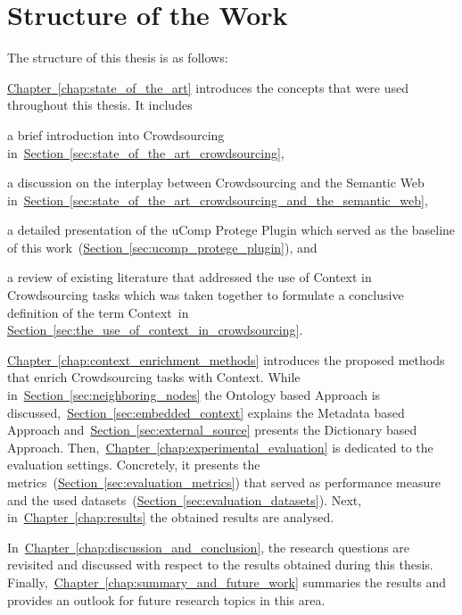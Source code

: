 \section{Structure of the Work}
The structure of this thesis is as follows:

\hyperref[chap:state_of_the_art]{Chapter~\ref*{chap:state_of_the_art}} introduces the concepts that were used throughout this thesis. It includes
\begin{inparaenum}[i)]
		\item a brief introduction into Crowdsourcing in~\hyperref[sec:state_of_the_art_crowdsourcing]{Section~\ref*{sec:state_of_the_art_crowdsourcing}},
		\item a discussion on the interplay between Crowdsourcing and the Semantic Web in~\hyperref[sec:state_of_the_art_crowdsourcing_and_the_semantic_web]{Section~\ref*{sec:state_of_the_art_crowdsourcing_and_the_semantic_web}},
		\item a detailed presentation of the uComp Protege Plugin which served as the baseline of this work~(\hyperref[sec:ucomp_protege_plugin]{Section~\ref*{sec:ucomp_protege_plugin}}), and 
		\item a review of existing literature that addressed the use of Context in Crowdsourcing tasks which was taken together to formulate a conclusive definition of the term \guillemotright Context\guillemotleft~in \hyperref[sec:the_use_of_context_in_crowdsourcing]{Section~\ref*{sec:the_use_of_context_in_crowdsourcing}}.
\end{inparaenum}

\hyperref[chap:context_enrichment_methods]{Chapter~\ref*{chap:context_enrichment_methods}} introduces the proposed methods that enrich Crowdsourcing tasks with Context. While in~\hyperref[sec:neighboring_nodes]{Section~\ref*{sec:neighboring_nodes}} the Ontology based Approach is discussed,~\hyperref[sec:embedded_context]{Section~\ref*{sec:embedded_context}} explains the Metadata based Approach and~\hyperref[sec:external_source]{Section~\ref*{sec:external_source}} presents the Dictionary based Approach. Then,~\hyperref[chap:experimental_evaluation]{Chapter~\ref*{chap:experimental_evaluation}} is dedicated to the evaluation settings. Concretely, it presents the metrics~(\hyperref[sec:evaluation_metrics]{Section~\ref*{sec:evaluation_metrics}}) that served as performance measure and the used
datasets~(\hyperref[sec:evaluation_datasets]{Section~\ref*{sec:evaluation_datasets}}).
Next, in~\hyperref[chap:results]{Chapter~\ref*{chap:results}} the obtained results are analysed.

In~\hyperref[chap:discussion_and_conclusion]{Chapter~\ref*{chap:discussion_and_conclusion}}, the research questions are revisited and discussed
with respect to the results obtained during this thesis. Finally,~\hyperref[chap:summary_and_future_work]{Chapter~\ref*{chap:summary_and_future_work}}
summaries the results and provides an outlook for future research topics in this area.
